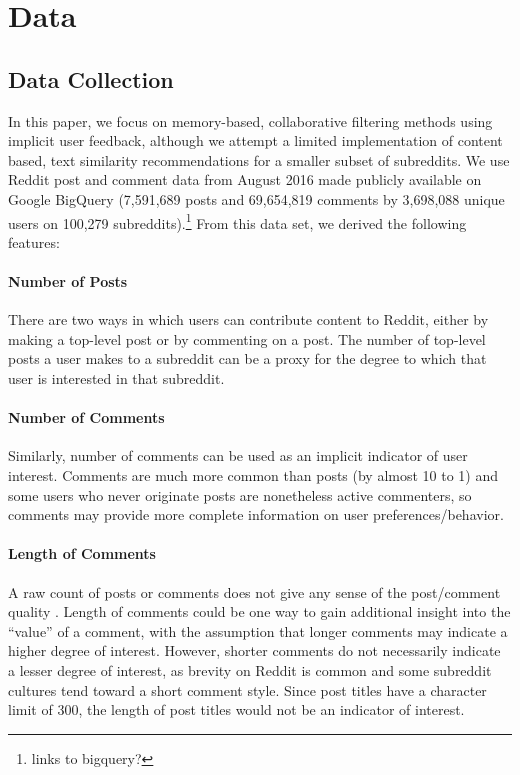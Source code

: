 \documentclass{article}
\begin{document}
\section{Data}
\label{sec:data}

\subsection{Data Collection}
\label{sec:feature-mapping}
In this paper, we focus on memory-based, collaborative filtering methods using implicit user feedback, although we attempt a limited implementation of content based, text similarity recommendations for a smaller subset of subreddits.  We use Reddit post and comment data from August 2016 made publicly available on Google BigQuery (7,591,689 posts and 69,654,819 comments by 3,698,088 unique users on 100,279 subreddits).\footnote{links to bigquery?} From this data set, we derived the following features:

\paragraph{Number of Posts} There are two ways in which users can contribute content to Reddit, either by making a top-level post or by commenting on a post.  The number of top-level posts a user makes to a subreddit can be a proxy for the degree to which that user is interested in that subreddit.  

\paragraph{Number of Comments} Similarly, number of comments can be used as an implicit indicator of user interest.  Comments are much more common than posts (by almost 10 to 1) and some users who never originate posts are nonetheless active commenters, so comments may provide more complete information on user preferences/behavior. 

\paragraph{Length of Comments} A raw count of posts or comments does not give any sense of the post/comment quality .  Length of comments could be one way to gain additional insight into the “value” of a comment, with the assumption that longer comments may indicate a higher degree of interest.  However, shorter comments do not necessarily indicate a lesser degree of interest, as brevity on Reddit is common and some subreddit cultures tend toward a short comment style.  Since post titles have a character limit of 300, the length of post titles would not be an indicator of interest.  
\end{document}

